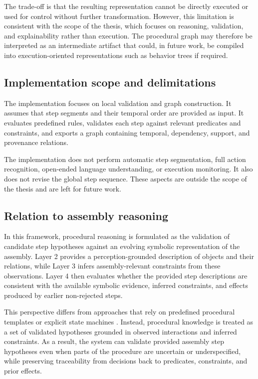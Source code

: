 The trade-off is that the resulting representation cannot be directly executed or used for control without further transformation. However, this limitation is consistent with the scope of the thesis, which focuses on reasoning, validation, and explainability rather than execution. The procedural graph may therefore be interpreted as an intermediate artifact that could, in future work, be compiled into execution-oriented representations such as behavior trees if required.

\subsection{Implementation scope and delimitations}

The implementation focuses on local validation and graph construction. It assumes that step segments and their temporal order are provided as input. It evaluates predefined rules, validates each step against relevant predicates and constraints, and exports a graph containing temporal, dependency, support, and provenance relations.

The implementation does not perform automatic step segmentation, full action recognition, open-ended language understanding, or execution monitoring. It also does not revise the global step sequence. These aspects are outside the scope of the thesis and are left for future work.

\subsection{Relation to assembly reasoning}

In this framework, procedural reasoning is formulated as the validation of candidate step hypotheses against an evolving symbolic representation of the assembly. Layer 2 provides a perception-grounded description of objects and their relations, while Layer 3 infers assembly-relevant constraints from these observations. Layer 4 then evaluates whether the provided step descriptions are consistent with the available symbolic evidence, inferred constraints, and effects produced by earlier non-rejected steps.

This perspective differs from approaches that rely on predefined procedural templates or explicit state machines \citep{Stanescu_2022,Stanescu_2023,Stanescu_2024}. Instead, procedural knowledge is treated as a set of validated hypotheses grounded in observed interactions and inferred constraints. As a result, the system can validate provided assembly step hypotheses even when parts of the procedure are uncertain or underspecified, while preserving traceability from decisions back to predicates, constraints, and prior effects.


